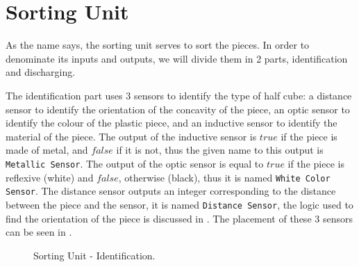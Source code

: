 \section{Sorting Unit}
\label{sec:sortingUnit}
As the name says, the sorting unit serves to sort the pieces.
In order to denominate its inputs and outputs, we will divide them in 2 parts,
identification and discharging.

The identification part uses 3 sensors to identify the type of half cube: a
distance sensor to identify the orientation of the concavity of the piece, an
optic sensor to identify the colour of the plastic piece, and an inductive sensor
to identify the material of the piece. The output of the inductive sensor is
$true$ if the piece is made of metal, and $false$ if it is not, thus the given
name to this output is \verb|Metallic Sensor|. The output of the optic sensor is
equal to $true$ if the piece is reflexive (white) and $false$, otherwise
(black), thus it is named \verb|White Color Sensor|. The distance sensor outputs
an integer corresponding to the distance between the piece and the sensor, it is
named \verb|Distance Sensor|, the logic used to find the orientation of the
piece is discussed in .
The placement of these 3 sensors can be seen in . 
\begin{figure}[H]
  \centering
  \caption{Sorting Unit - Identification.}
  \label{fig:sortIden}
\end{figure}

